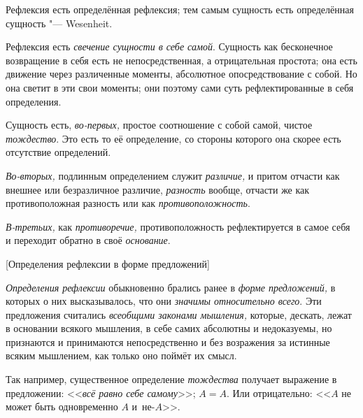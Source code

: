 
Рефлексия есть определённая рефлексия; тем самым
сущность есть определённая сущность "--- Wesenheit.

Рефлексия есть {\em свечение сущности в себе самой}.
Сущность как бесконечное возвращение в себя есть не непосредственная, а
отрицательная простота; она есть движение через различенные моменты,
абсолютное опосредствование с собой. Но она светит в эти свои моменты; они
поэтому сами суть рефлектированные в себя определения.

Сущность есть, {\em во-первых,} простое соотношение с
собой самой, чистое {\em тождество}. Это есть то её
определение, со стороны которого она скорее есть отсутствие определений.

{\em Во-вторых,} подлинным определением служит {\em различие,} и притом
отчасти как внешнее или безразличное различие, {\em разность} вообще,
отчасти же как противоположная разность или как {\em противоположность}.

{\em В-третьих,} как {\em противоречие,} противоположность рефлектируется в
самое себя и переходит обратно в своё {\em основание}.

%
  {[Определения рефлексии в форме предложений]}

{\em Определения рефлексии} обыкновенно брались ранее в
{\em форме предложений,} в которых о них высказывалось,
что они {\em значимы относительно всего}. Эти
предложения считались {\em всеобщими законами
мышления,} которые, дескать, лежат в основании всякого мышления, в себе
самих абсолютны и недоказуемы, но признаются и принимаются непосредственно
и без возражения за истинные всяким мышлением, как только оно поймёт их смысл.

Так например, существенное определение {\em тождества}
получает выражение в предложении: <<{\em всё равно себе
самому}>>; $A=A$. Или отрицательно: <<$A$ не может
быть одновременно $A$ и~не-$A$>>.

